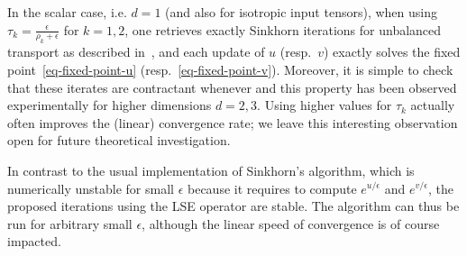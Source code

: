 %

\begin{rem}\label{rem-choice-tau}
 In the scalar case, i.e. $d=1$ (and also for isotropic input tensors), when using $\tau_k = \tfrac{\epsilon}{\rho_k+\epsilon}$ for $k=1,2$, one retrieves exactly Sinkhorn iterations for unbalanced transport as described in~\cite{2016-chizat-sinkhorn}, and each update of $u$ (resp.\ $v$) exactly solves the fixed point~\eqref{eq-fixed-point-u} (resp.\ \eqref{eq-fixed-point-v}). 
%
Moreover, it is simple to check that these iterates are contractant whenever
\eq{
	\tau_k \in ]0,\tfrac{2 \epsilon}{\epsilon+\rho_k}[
	\quad\text{for } k=1,2.
}
	and this property has been observed experimentally for higher dimensions $d=2,3$. Using higher values for $\tau_k$ actually often improves the (linear) convergence rate; we leave this interesting observation open for future theoretical investigation. 
\end{rem}


\begin{rem}[Stability]In contrast to the usual implementation of Sinkhorn's algorithm, which is numerically unstable for small $\epsilon$ because it requires to compute $e^{u/\epsilon}$ and $e^{v/\epsilon}$, the proposed iterations using the LSE operator are stable. The algorithm can thus be run for arbitrary small $\epsilon$, although the linear speed of convergence is of course impacted. 
\end{rem}


